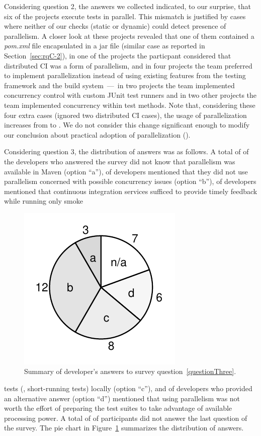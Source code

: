 Considering question 2, the answers we collected indicated, to our
surprise, that six of the \emailsProjectsAnswered{} projects execute
tests in parallel.  This mismatch is justified by cases where neither
of our checks (static or dynamic) could detect presence of
parallelism.  A closer look at these projects revealed that one of
them contained a \emph{pom.xml} file encapsulated in a jar file
(similar case as reported in Section~\ref{sec:rqC-2}), in one of the
projects the particpant considered that distributed CI was a form of
parallelism, and in four projects the team preferred to implement
parallelization instead of using existing features from the testing
framework and the build system~---~in two projects the team
implemented concurrency control with custom JUnit test runners and in
two other projects the team implemented concurrency within test
methods.  Note that, considering these four extra cases (ignored two
distributed CI cases), the usage of parallelization increases from
\percentParallel{} to \percentParallelUpdated{}.  We do not consider
this change significant enough to modify our conclusion about
practical adoption of parallelization (\numRQAdoptionOne{}).



Considering question 3, the distribution of answers was as follows.  A
total of \emailsA{} of the \emailsProjectsAnswered{} developers who
answered the survey did not know that parallelism was available in
Maven (option ``a''), \emailsB{} of developers mentioned that they did
not use parallelism concerned with possible concurrency issues (option
``b''), \emailsD{} of developers mentioned that continuous integration
services sufficed to provide timely feedback while running only smoke
\begin{figure}%
    \centering
    \includegraphics[width=.18\textwidth]{plots/survey.pdf}
    \caption{\label{fig:rq5-answers}Summary of developer's answers to
      survey question~\ref{questionThree}.}
\end{figure}
tests (\ie{}, short-running tests) locally (option ``c''), and \emailsD{} of
developers who provided an alternative answer (option ``d'') mentioned
that using parallelism was not worth the effort of preparing the test
suites to take advantage of available processing power.  A total of
\emailsNA{} of participants did not answer the last question of the
survey.  The pie chart in Figure~\ref{fig:rq5-answers} 
summarizes the distribution of answers.

